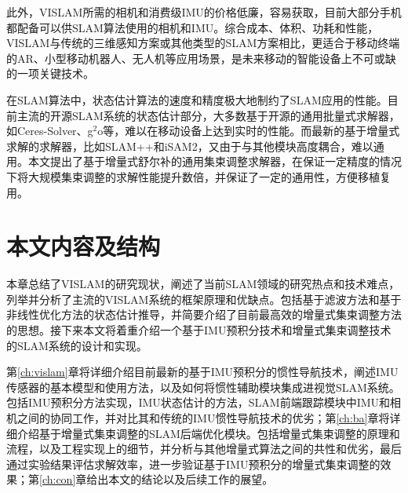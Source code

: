 此外，VISLAM所需的相机和消费级IMU的价格低廉，容易获取，目前大部分手机都配备可以供SLAM算法使用的相机和IMU。综合成本、体积、功耗和性能，VISLAM与传统的三维感知方案或其他类型的SLAM方案相比，更适合于移动终端的AR、小型移动机器人、无人机等应用场景，是未来移动的智能设备上不可或缺的一项关键技术。

在SLAM算法中，状态估计算法的速度和精度极大地制约了SLAM应用的性能。目前主流的开源SLAM系统的状态估计部分，大多数基于开源的通用批量式求解器，如Ceres-Solver\citep{ceres-solver}、g$^2$o\citep{kummerle2011g}等，难以在移动设备上达到实时的性能。而最新的基于增量式求解的求解器，比如SLAM++\citep{ila2017fast}和iSAM2\citep{kaess2012isam2}，又由于与其他模块高度耦合，难以通用。本文提出了基于增量式舒尔补的通用集束调整求解器，在保证一定精度的情况下将大规模集束调整的求解性能提升数倍，并保证了一定的通用性，方便移植复用。




\section{本文内容及结构}

本章总结了VISLAM的研究现状，阐述了当前SLAM领域的研究热点和技术难点，列举并分析了主流的VISLAM系统的框架原理和优缺点。包括基于滤波方法和基于非线性优化方法的状态估计推导，并简要介绍了目前最高效的增量式集束调整方法的思想。接下来本文将着重介绍一个基于IMU预积分技术和增量式集束调整技术的SLAM系统的设计和实现。

第\ref{ch:vislam}章将详细介绍目前最新的基于IMU预积分的惯性导航技术，阐述IMU传感器的基本模型和使用方法，以及如何将惯性辅助模块集成进视觉SLAM系统。包括IMU预积分方法实现，IMU状态估计的方法，SLAM前端跟踪模块中IMU和相机之间的协同工作，并对比其和传统的IMU惯性导航技术的优劣；第\ref{ch:ba}章将详细介绍基于增量式集束调整的SLAM后端优化模块。包括增量式集束调整的原理和流程，以及工程实现上的细节，并分析与其他增量式算法之间的共性和优劣，最后通过实验结果评估求解效率，进一步验证基于IMU预积分的增量式集束调整的效果；第\ref{ch:con}章给出本文的结论以及后续工作的展望。
